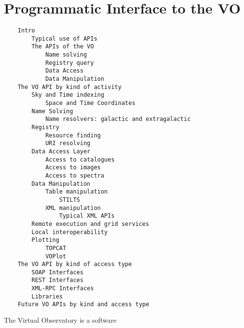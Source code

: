 \chapter{Programmatic Interface to the VO} %
\label{cha:voapi}

\begin{verbatim}
	Intro
		Typical use of APIs
		The APIs of the VO
			Name solving
			Registry query
			Data Access
			Data Manipulation
	The VO API by kind of activity
		Sky and Time indexing
			Space and Time Coordinates
		Name Solving
			Name resolvers: galactic and extragalactic
		Registry
			Resource finding
			URI resolving
		Data Access Layer
			Access to catalogues
			Access to images
			Access to spectra
		Data Manipulation
			Table manipulation
				STILTS
			XML manipulation
				Typical XML APIs
		Remote execution and grid services
		Local interoperability
		Plotting
			TOPCAT
			VOPlot
	The VO API by kind of access type
		SOAP Interfaces
		REST Interfaces
		XML-RPC Interfaces
		Libraries
	Future VO APIs by kind and access type
\end{verbatim}

The Virtual Observatory is a software 

